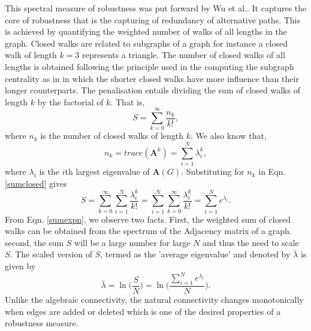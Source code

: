 \documentclass[10pt,a4paper]{article}
\theoremstyle{plain}
\theoremstyle{definition}
\begin{document}
\begin{enumerate}
		This spectral measure of robustness was put forward by Wu et al.\citep{wu2564spectral}. It captures the core of robustness that is the capturing of redundancy of alternative paths. This is achieved by quantifying the weighted number of walks of all lengths in the graph. Closed walks are related to subgraphs of a graph for instance a closed walk of length $k=3$ represents a triangle. The number of closed walks of all lengths is obtained following the principle used in the computing the subgraph centrality as in \citep{estrada2011structure} in which the shorter closed walks have more influence than their longer counterparts. The penalisation entails dividing the sum of closed walks of length $k$ by the factorial of $k$. That is,  
		\begin{equation}
		S = \sum_{k=0}^{\infty} \frac{n_k}{k!},
		\label{sumclosed}
		\end{equation} 
		where $n_k$ is the number of closed walks of length $k$. We also know that,
		\begin{equation}
		n_k = trace(\mathbf{A}^k) = \sum_{i=1}^{N} \lambda_{i} ^k,
		\end{equation}
		where $\lambda_i$ is the $i$th largest eigenvalue of $\mathbf{A}(G)$.
		Substituting for $n_k$ in Eqn.\ref{sumclosed} gives
		\begin{equation}
		S = \sum_{k=0}^{\infty} \sum_{i=1}^{N} \frac{\lambda_{i} ^k} {k!} =  \sum_{i=1}^{N}\sum_{k=0}^{\infty} \frac{\lambda_{i} ^k} {k!}= \sum_{i=1}^{N} e^{\lambda_i}.
		\label{sumexpn}
		\end{equation}
		From Eqn. \ref{sumexpn}, we observe two facts. First, the weighted sum of closed walks can be obtained from the spectrum of the Adjacency matrix of a graph. second, the sum $S$ will be a large number for large $N$ and  thus the need to scale $S$. The scaled version of $S$, termed as the 'average eigenvalue' and denoted by $\bar{\lambda}$  is given by
		\begin{equation}
		\bar{\lambda} = \ln \big( \frac{S}{N}\big) = \ln \Big( \frac{\sum_{i=1}^{N} e^{\lambda_i}}{N} \Big).
		\end{equation}
		Unlike the algebraic connectivity, the natural connectivity changes monotonically when edges are added or deleted which is one of the desired properties of a robustness measure.
	\end{enumerate}
\end{document}
